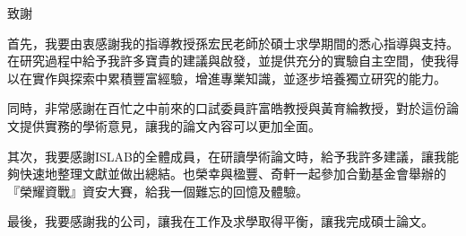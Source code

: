\thispagestyle{plain}
\begin{center} \begin{huge} 致謝 \end{huge} \end{center}

首先，我要由衷感謝我的指導教授孫宏民老師於碩士求學期間的悉心指導與支持。在研究過程中給予我許多寶貴的建議與啟發，並提供充分的實驗自主空間，使我得以在實作與探索中累積豐富經驗，增進專業知識，並逐步培養獨立研究的能力。

同時，非常感謝在百忙之中前來的口試委員許富皓教授與黃育綸教授，對於這份論文提供實務的學術意見，讓我的論文內容可以更加全面。

其次，我要感謝ISLAB的全體成員，在研讀學術論文時，給予我許多建議，讓我能夠快速地整理文獻並做出總結。也榮幸與楹豐、奇軒一起參加合勤基金會舉辦的『榮耀資戰』資安大賽，給我一個難忘的回憶及體驗。

最後，我要感謝我的公司，讓我在工作及求學取得平衡，讓我完成碩士論文。

\newpage